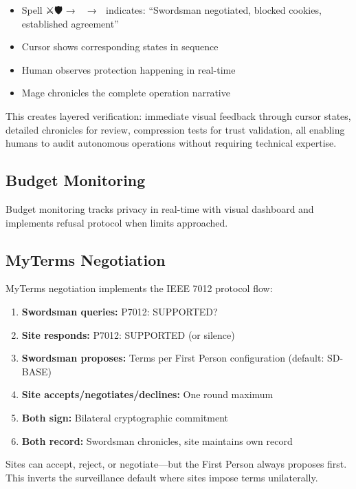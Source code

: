 \documentclass[
]{article}
\providecommand{\tightlist}{%
  \setlength{\itemsep}{0pt}\setlength{\parskip}{0pt}}
\begin{document}
\begin{itemize}
\item
  Spell ⚔️🛡️ → 🚫🍪 → 🤝 indicates: ``Swordsman negotiated, blocked
  cookies, established agreement''
\item
  Cursor shows corresponding states in sequence
\item
  Human observes protection happening in real-time
\item
  Mage chronicles the complete operation narrative
\end{itemize}

This creates layered verification: immediate visual feedback through
cursor states, detailed chronicles for review, compression tests for
trust validation, all enabling humans to audit autonomous operations
without requiring technical expertise.

\subsection{Budget Monitoring}\label{budget-monitoring}

Budget monitoring tracks privacy in real-time with visual dashboard and
implements refusal protocol when limits approached.

\subsection{MyTerms Negotiation}\label{myterms-negotiation}

MyTerms negotiation implements the IEEE 7012 protocol flow:

\begin{enumerate}
\def\labelenumi{\arabic{enumi}.}
\tightlist
\item
  \textbf{Swordsman queries:} P7012: SUPPORTED?
\item
  \textbf{Site responds:} P7012: SUPPORTED (or silence)
\item
  \textbf{Swordsman proposes:} Terms per First Person configuration
  (default: SD-BASE)
\item
  \textbf{Site accepts/negotiates/declines:} One round maximum
\item
  \textbf{Both sign:} Bilateral cryptographic commitment
\item
  \textbf{Both record:} Swordsman chronicles, site maintains own record
\end{enumerate}

Sites can accept, reject, or negotiate---but the First Person always
proposes first. This inverts the surveillance default where sites impose
terms unilaterally.
\end{document}
